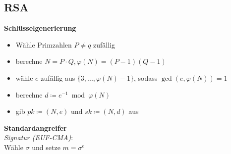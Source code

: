\documentclass[10pt,a4paper]{article}
\begin{document}
        \subsection{RSA}
        \textbf{Schlüsselgenerierung}
        \begin{itemize}
          \item Wähle Primzahlen \(P \neq q\) zufällig
          \item berechne \(N = P \cdot Q, \varphi(N) = (P-1)(Q-1)\)
          \item wähle \(e\) zufällig aus \(\{3,...,\varphi(N)-1\}\), sodass \(\gcd(e, \varphi(N)) = 1\)
          \item berechne \(d \coloneqq e^{-1} \bmod \varphi(N)\)
          \item gib \(\mathit{pk} \coloneqq (N, e)\) und \(\mathit{sk} \coloneqq (N, d)\) aus
        \end{itemize}
        \textbf{Standardangreifer}\\
        \textit{Signatur (EUF-CMA)}:\\
        Wähle \(\sigma\) und setze \(m = \sigma^e\)
\end{document}
